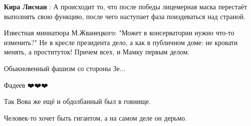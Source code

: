 \begin{itemize}
\begin{itemize}
 
\textbf{Кира Лисман} : А происходит то, что после победы лицемерная маска перестаёт выполнять свою функцию, после чего наступает фаза поиздеваться над страной.
\end{itemize}

 

Известная миниатюра М.Жванецкого: "Может в консерватории нужно что-то
изменить?" Не в кресле президента дело, а как в публичном доме: не кровати
менять, а проституток! Причем всех, и Мамку первым делом.

 
Обыкновенный фашизм со стороны Зе...

 
Фадеев ❤️❤️❤️

 
Так Вова же ещё и обдолбанный был в говнище.

 
Человек-то хочет быть гигантом, а на самом деле он дерьмо.


\end{itemize}
